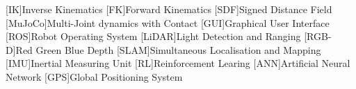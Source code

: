     \begin{acronym}[MMIIII]
        [IK]{Inverse Kinematics}
        [FK]{Forward Kinematics}
        [SDF]{Signed Distance Field}
        [MuJoCo]{Multi-Joint dynamics with Contact}
        [GUI]{Graphical User Interface}
        [ROS]{Robot Operating System}
        [LiDAR]{Light Detection and Ranging}
        [RGB-D]{Red Green Blue Depth}
        [SLAM]{Simultaneous Localisation and Mapping}
        [IMU]{Inertial Measuring Unit}
        [RL]{Reinforcement Learing}
        [ANN]{Artificial Neural Network}
        [GPS]{Global Positioning System}
    \end{acronym}    

